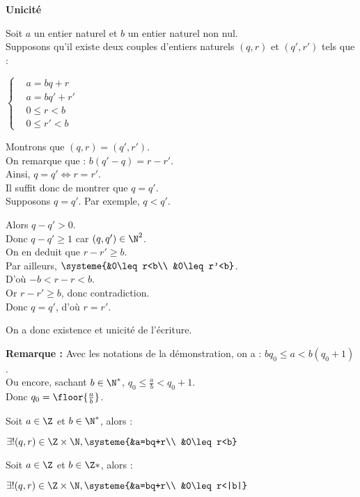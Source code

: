 \documentclass[12pt,twoside,a4paper]{article}
\begin{document}
\begin{preuve}
\begin{tab}
\begin{liste}
\begin{tab}
\begin{tab}
						\end{tab}
					\end{tab}
			\end{liste}
		\end{tab}
		 \textbf{Unicit\'e}
		\begin{tab}
			Soit $a$ un entier naturel et $b$ un entier naturel non nul. \\
			Supposons qu'il existe deux couples d'entiers naturels $(q,r)$ et $(q',r')$ tels que :
			\begin{tab}
				$\left\{\begin{aligned}&a=bq+r \\
									   &a=bq'+r' \\
									   &0\leq r<b \\
									   &0\leq r'<b\end{aligned}\right.$
			\end{tab}
			Montrons que $(q,r)=(q',r')$. \\
			On remarque que : $b(q'-q)=r-r'$. \\
			Ainsi, $q=q'\iff r=r'$. \\
			Il suffit donc de montrer que $q=q'$. \\
			 Supposons $q=q'$. Par exemple, $q<q'$.
			\begin{tab}
				Alors $q-q'>0$. \\
				Donc $q-q'\geq 1$ car $(q,q')\in\N^2$. \\
				On en deduit que $r-r'\geq b$. \\
				Par ailleurs, $\systeme{&0\leq r<b\\
										&0\leq r'<b}$. \\
				D'o\`u $-b<r-r<b$. \\
				Or $r-r'\geq b$, donc contradiction. \\
				Donc $q=q'$, d'o\`u $r=r'$.
			\end{tab}
			On a donc existence et unicit\'e de l'\'ecriture.
		\end{tab}
	\end{preuve}
	\textbf{Remarque :} Avec les notations de la d\'emonstration, on a : $bq_0\leq a<b(q_0+1)$. \\
	Ou encore, sachant $b\in\N^*$, $q_0\leq \frac{a}{b}<q_0+1$. \\
	Donc $q_0=\floor{\frac{a}{b}}$.
	\begin{coro}
		 Soit $a\in\Z$ et $b\in\N^*$, alors :
		\begin{tab}
			\begin{tab}
				$\exists!(q,r)\in\Z\times\N,\systeme{&a=bq+r\\
													 &0\leq r<b}$
			\end{tab}
		\end{tab}
		 Soit $a\in\Z$ et $b\in\Z*$, alors :
		\begin{tab}
			\begin{tab}
				$\exists!(q,r)\in\Z\times\N,\systeme{&a=bq+r\\
													 &0\leq r<|b|}$
			\end{tab}
		\end{tab}
	\end{coro}
\end{document}
